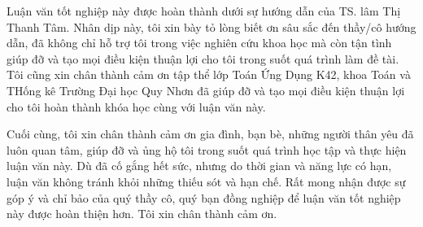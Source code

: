 \documentclass[12pt,a4paper,oneside]{report}
\numberwithin{equation}{section}
\begin{document}
\begin{justify}
Luận văn tốt nghiệp này được hoàn thành dưới sự hướng dẫn của TS. lâm Thị Thanh Tâm. Nhân dịp này, tôi xin bày tỏ lòng biết ơn sâu sắc đến thầy/cô hướng dẫn, đã không chỉ hỗ trợ tôi trong việc nghiên cứu khoa học mà còn tận tình giúp đỡ và tạo mọi điều kiện thuận lợi cho tôi trong suốt quá trình làm đề tài. Tôi cũng xin chân thành cảm ơn tập thể lớp Toán Ứng Dụng K42, khoa Toán và THống kê Trường Đại học Quy Nhơn đã giúp đỡ và tạo mọi điều kiện thuận lợi cho tôi hoàn thành khóa học cùng với luận văn này.

Cuối cùng, tôi xin chân thành cảm ơn gia đình, bạn bè, những người thân yêu đã luôn quan tâm, giúp đỡ và ủng hộ tôi trong suốt quá trình học tập và thực hiện luận văn này. Dù đã cố gắng hết sức, nhưng do thời gian và năng lực có hạn, luận văn không tránh khỏi những thiếu sót và hạn chế. Rất mong nhận được sự góp ý và chỉ bảo của quý thầy cô, quý bạn đồng nghiệp để luận văn tốt nghiệp này được hoàn thiện hơn. Tôi xin chân thành cảm ơn.
\end{justify}
\end{document}
